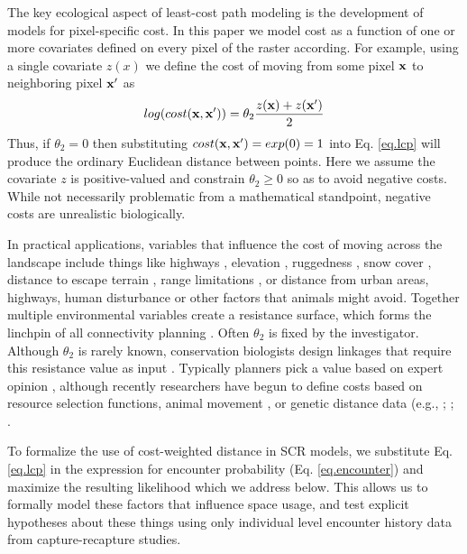 The key ecological aspect of least-cost path modeling is the
development
of models for pixel-specific cost.
In this paper we model cost as a function of one or more covariates
defined on every pixel of the raster according. For example, using a
single covariate $z(x)$ we define the cost of moving from some pixel
${\bf x}$ to neighboring pixel ${\bf x}'$ as
\begin{equation}
 log(cost({\bf x},{\bf x}'))=  \theta_{2} \frac{z({\bf x})+z({\bf x}')}{2}
\label{ecoldist.eq.cost}
\end{equation}
Thus, if $\theta_{2} = 0$ then substituting $cost({\bf x},{\bf x}')
=exp(0) = 1$ into
Eq. \ref{eq.lcp} will produce the ordinary Euclidean distance
between points. Here we assume the covariate $z$ is positive-valued
and constrain $\theta_{2}\ge 0$ so as to avoid
negative costs. While not necessarily problematic from a mathematical
standpoint, negative costs are unrealistic biologically. 

In practical applications, variables that influence the cost of moving
across the landscape include things like highways
\citep[e.g.,][]{epps_etal:2005}, elevation \citep{cushman_etal:2006},
ruggedness \citep{epps_etal:2007}, snow cover
\citep{schwartz_etal:2009}, distance to escape terrain
\citep{shirk_etal:2010}, range limitations \citep{mcrae_beier:2007},
or distance from urban areas, highways, human disturbance or other
factors that animals might avoid.  Together multiple environmental
variables create a resistance surface, which forms the linchpin of all
connectivity planning \citep{spear_etal:2010}.  Often $\theta_{2}$ is
fixed by the investigator. Although $\theta_{2}$ is rarely known,
conservation biologists design linkages that require this resistance
value as input \citep[see][and articles cited
therein]{beier_etal:2008}.  Typically planners pick a value based on
expert opinion \citep{beier_etal:2008}, although recently researchers
have begun to define costs based on resource selection functions,
animal movement \citep{tracy:2006, fortin_etal:2005}, or genetic
distance data (e.g., \citet{gerlach_musolf:2000};
\citet{epps_etal:2007}; \citet{schwartz_etal:2009}.

To formalize the use of cost-weighted distance in SCR models, we
substitute Eq. \ref{eq.lcp} in the expression for encounter
probability (Eq. \ref{eq.encounter}) and maximize the resulting
likelihood which we address below. This allows us to formally model
these factors that influence space usage, and test explicit hypotheses
about these things using only individual level encounter history data
from capture-recapture studies.


